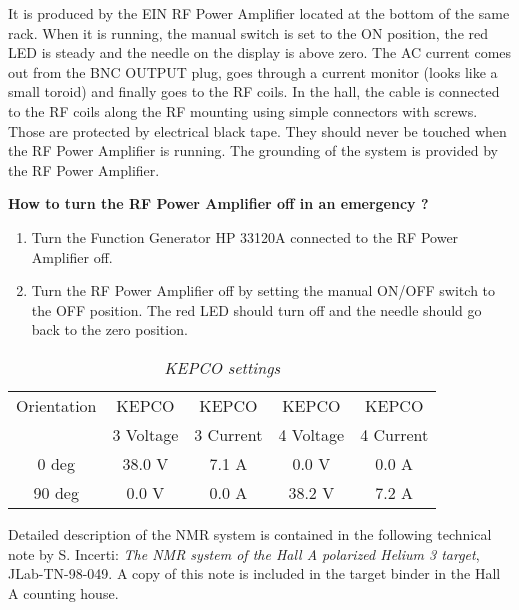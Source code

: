 \begin{safetyen}{10}{5}
It is produced by the EIN RF Power Amplifier located at the bottom of
the same rack. When 
it is running, the manual switch is set to the ON position, the red LED
is steady and the needle on the display is
above zero. The AC current comes out from the BNC OUTPUT plug, goes
through a current monitor (looks like a small
toroid) and finally goes to the RF coils. In the hall, the cable is
connected to the RF coils along the RF
mounting using simple connectors with screws. Those are protected by
electrical black tape. They should never be
touched when the RF Power Amplifier is running.  The grounding of the
system is provided by the RF Power Amplifier.

\centerline {\bf How to turn the RF Power Amplifier off in an emergency
?}

\begin{enumerate}

\item Turn the Function Generator HP 33120A connected to the RF Power
Amplifier off.

\item Turn the RF Power Amplifier off by setting the manual ON/OFF
switch to the OFF position. The red LED 
should turn off and the needle should go back to the zero position. 

\end{enumerate} 

\begin{table}[h]
\begin{center}
\caption{ \label{settings} {\it KEPCO settings} }\begin{tabular}[b]
{|c|c|c|c|c|}
\hline
Orientation & KEPCO     & KEPCO     & KEPCO     & KEPCO \\
            & 3 Voltage & 3 Current & 4 Voltage & 4 Current
\\ \hline
0 deg & 38.0 V & 7.1 A & 0.0 V & 0.0 A \\
90 deg & 0.0 V & 0.0 A & 38.2 V & 7.2 A \\ \hline
\end{tabular}
 \end{center}
  \end{table}

\end{safetyen}

Detailed description of the NMR system is contained in the 
following technical note by S. Incerti: {\it The NMR system of the Hall A
polarized Helium 3 target}, JLab-TN-98-049. A copy of this note is included
in the target 
binder in the Hall A counting house.



